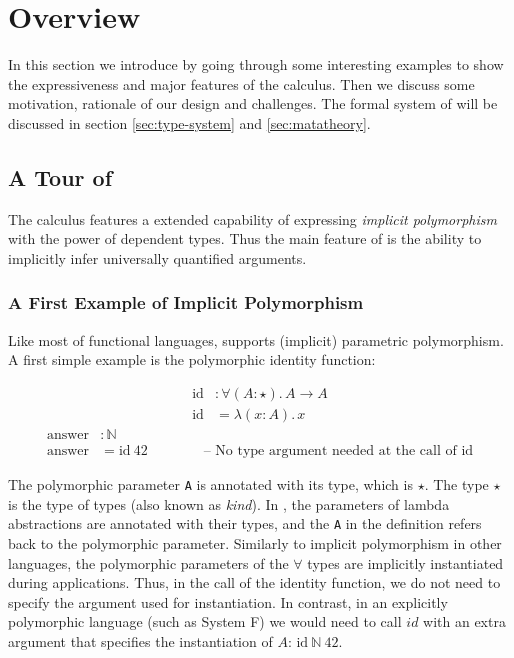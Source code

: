 \section{Overview}

In this section we introduce \name by going through
some interesting examples to show the expressiveness and major features of the calculus.
Then we discuss some motivation, rationale of our design and challenges.
The formal system of \name will be
discussed in section \ref{sec:type-system} and \ref{sec:matatheory}.

\subsection{A Tour of \name}
\label{sec:examples}

The \name calculus features a extended capability of expressing \emph{implicit
  polymorphism} with the power of dependent types. Thus the main feature of \name
is the ability to implicitly infer universally quantified arguments.  

\subsubsection{A First Example of Implicit Polymorphism}
Like most of functional languages, \name supports (implicit) parametric polymorphism.
A first simple example is the polymorphic identity
function:

\begin{align*}
\mathrm{id} &: \forall (A : \star).\, A \rightarrow A \\
\mathrm{id} &= \lambda (x : A).\, x
\end{align*}
\begin{align*}
\mathrm{answer} &: \mathbb{N} \\
\mathrm{answer} &= \mathrm{id} ~ 42  \quad\quad\quad\quad    \text{-- No type argument needed at the call of $\mathrm{id}$}
\end{align*}

\noindent The polymorphic parameter \verb|A| is annotated with its type,
which is $\star$. The type $\star$ is the type of types (also known as
\emph{kind}). In \name, the parameters of lambda abstractions are annotated
with their types, and the \verb|A| in the definition refers back to the
polymorphic parameter. Similarly to implicit polymorphism in other languages,
the polymorphic parameters of the $\forall$ types are implicitly instantiated
during applications. Thus, in the call of the identity function, we
do not need to specify the argument used for instantiation. In contrast,
in an explicitly polymorphic language (such as System F) we would need
to call $id$ with an extra argument that specifies the instantiation of $A$:
$\mathrm{id}~\mathbb{N}~ 42$. 


